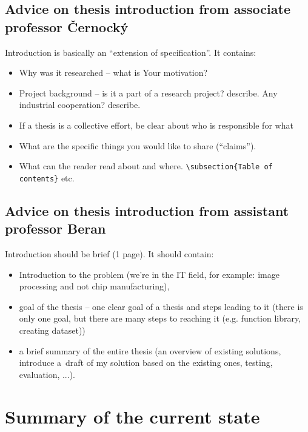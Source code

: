 {{\subsection*{Advice on thesis introduction from associate professor Černocký}

Introduction is basically an ``extension of specification''. It contains:

\begin{itemize}
  \item{Why was it researched -- what is Your motivation?}
  \item{Project background -- is it a part of a research project? describe. Any industrial cooperation? describe.}
  \item{If a thesis is a collective effort, be clear about who is responsible for what}
  \item{What are the specific things you would like to share (``claims'').}
  \item{What can the reader read about and where. \texttt{\textbackslash subsection\{Table of contents\}} etc.}
\end{itemize}

\subsection*{Advice on thesis introduction from assistant professor Beran}

Introduction should be brief (1 page). It should contain:
\begin{itemize}
  \item{Introduction to the problem (we're in the IT field, for example: image processing and not chip manufacturing),}
  \item{goal of the thesis -- one clear goal of a thesis and steps leading to it (there is only one goal, but there are many steps to reaching it (e.g. function library, creating dataset))}
  \item{a brief summary of the entire thesis (an overview of existing solutions, introduce a~draft of my solution based on the existing ones, testing, evaluation, ...).}
\end{itemize}


\section{Summary of the current state}
\label{stav}

}}
